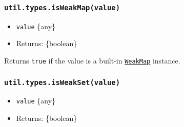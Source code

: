 \begin{Shaded}
\begin{Highlighting}[]
\NormalTok{(} \NormalTok{())}\OperatorTok{;}  
\NormalTok{(} \NormalTok{())}\OperatorTok{;}  
\NormalTok{(} \NormalTok{())}\OperatorTok{;}  
\end{Highlighting}
\end{Shaded}

\subsubsection{\texorpdfstring{\texttt{util.types.isWeakMap(value)}}{util.types.isWeakMap(value)}}\label{util.types.isweakmapvalue}

\begin{itemize}
\tightlist
\item
  \texttt{value} \{any\}
\item
  Returns: \{boolean\}
\end{itemize}

Returns \texttt{true} if the value is a built-in
\href{https://developer.mozilla.org/en-US/docs/Web/JavaScript/Reference/Global_Objects/WeakMap}{\texttt{WeakMap}}
instance.

\begin{Shaded}
\begin{Highlighting}[]
\NormalTok{(} \NormalTok{())}\OperatorTok{;}  
\end{Highlighting}
\end{Shaded}

\subsubsection{\texorpdfstring{\texttt{util.types.isWeakSet(value)}}{util.types.isWeakSet(value)}}\label{util.types.isweaksetvalue}

\begin{itemize}
\tightlist
\item
  \texttt{value} \{any\}
\item
  Returns: \{boolean\}
\end{itemize}

